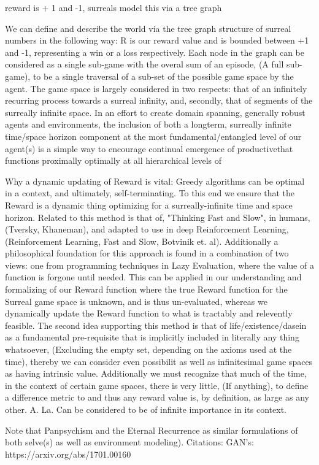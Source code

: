\documentclass{article}
\begin{document}
reward is + 1 and -1, surreals model this via a tree graph

We can define and describe the world via the tree graph structure of surreal numbers in the following way: R is our reward value and is bounded between +1 and -1, representing a win or a loss respectively. Each node in the graph can be considered as a single sub-game with the overal sum of an episode, (A full sub-game), to be a single traversal of a sub-set of the possible game space by the agent. The game space is largely considered in two respects: that of an infinitely recurring process towards a surreal infinity, and, secondly, that of segments of the surreally infinite space. In an effort to create domain spanning, generally robust agents and environments, the inclusion of both a longterm, surreally infinite time/space horizon component at the most fundamental/entangled level of our agent(s) is a simple way to encourage continual emergence of productivethat functions proximally optimally at all hierarchical levels of 

Why a dynamic updating of Reward is vital: Greedy algorithms can be optimal in a context, and ultimately, self-terminating. To this end we ensure that the Reward is a dynamic thing optimizing for a surreally-infinite time and space horizon. Related to this method is that of, "Thinking Fast and Slow", in humans, (Tversky, Khaneman), and adapted to use in deep Reinforcement Learning, (Reinforcement Learning, Fast and Slow, Botvinik et. al). Additionally a philosophical foundation for this approach is found in a combination of two views: one from programming techniques in Lazy Evaluation, where the value of a function is forgone until needed. This can be applied in our understanding and formalizing of our Reward function where the true Reward function for the Surreal game space is unknown, and is thus un-evaluated, whereas we dynamically update the Reward function to what is tractably and relevently feasible. The second idea supporting this method is that of life/existence/dasein as a fundamental pre-requisite that is implicitly included in literally any thing whatsoever, (Excluding the empty set, depending on the axioms used at the time), thereby we can consider even possibilit as well as infinitesimal game spaces as having intrinsic value. Additionally we must recognize that much of the time, in the context of certain game spaces, there is very little, (If anything), to define a difference metric to and thus any reward value is, by definition, as large as any other. A. La. Can be considered to be of infinite importance in its context.

Note that Panpsychism and the Eternal Recurrence as similar formulations of both selve(s) as well as environment modeling).
Citations: 
GAN's: https://arxiv.org/abs/1701.00160
\end{document}
